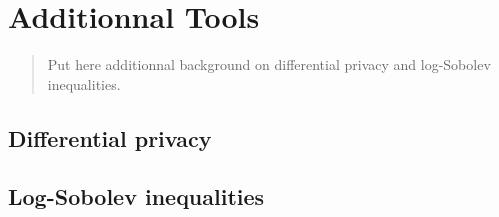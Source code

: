\chapter[Additionnal Tools]{Additionnal Tools}
\label{chap:other-background}
\addchapterlof
\addchapterloe
\addchapterloa

\minitoc

\begin{abstract}
    Put here additionnal background on differential privacy and log-Sobolev inequalities.
\end{abstract}

\section{Differential privacy}

\section{Log-Sobolev inequalities}